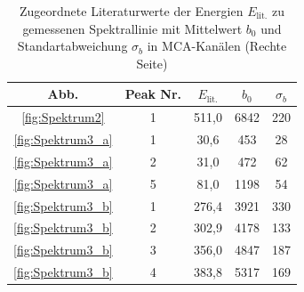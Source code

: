 \begin{table}
    \centering
    \caption{Zugeordnete Literaturwerte der Energien $E_\text{lit.}$ zu gemessenen Spektrallinie mit Mittelwert $b_0$ und Standartabweichung $\sigma_b$ in MCA-Kanälen (Rechte Seite)}
    \begin{tabular}{|c|c|c|c|c|}
        \hline
         Abb. & Peak Nr. & $E_\text{lit.}$ & $b_0$ & $\sigma_b$ \\ \hline \hline
         \ref{fig:Spektrum2} & 1 & 511,0 & 6842 & 220 \\ \hline
         \ref{fig:Spektrum3_a} & 1 & 30,6 & 453 & 28 \\ \hline
         \ref{fig:Spektrum3_a} & 2 & 31,0 & 472 & 62 \\ \hline
         \ref{fig:Spektrum3_a} & 5 & 81,0 & 1198 & 54 \\ \hline
         \ref{fig:Spektrum3_b} & 1 & 276,4 & 3921 & 330 \\ \hline
         \ref{fig:Spektrum3_b} & 2 & 302,9 & 4178 & 133 \\ \hline
         \ref{fig:Spektrum3_b} & 3 & 356,0 & 4847 & 187 \\ \hline
         \ref{fig:Spektrum3_b} & 4 & 383,8 & 5317 & 169 \\ \hline
    \end{tabular}
    \label{tab:Energieeichung1}
\end{table}

